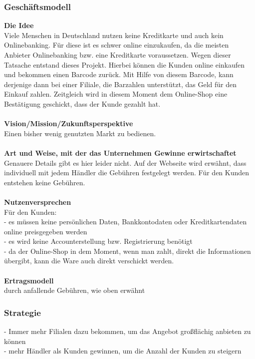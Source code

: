 \subsubsection{Geschäftsmodell}
\textbf{Die Idee}\\
Viele Menschen in Deutschland nutzen keine Kreditkarte und auch kein Onlinebanking. Für diese ist es schwer online 
einzukaufen, da die meisten Anbieter Onlinebanking bzw. eine Kreditkarte voraussetzen. Wegen dieser Tatsache entstand
dieses Projekt. Hierbei können die Kunden online einkaufen und bekommen einen Barcode zurück. Mit Hilfe von diesem
Barcode, kann derjenige dann bei einer Filiale, die Barzahlen unterstützt, das Geld für den Einkauf zahlen. Zeitgleich
wird in diesem Moment dem Online-Shop eine Bestätigung geschickt, dass der Kunde gezahlt hat.\\
\\
\textbf{Vision/Mission/Zukunftsperspektive}\\
Einen bisher wenig genutzten Markt zu bedienen.\\
\\
\textbf{Art und Weise, mit der das Unternehmen Gewinne erwirtschaftet}\\
Genauere Details gibt es hier leider nicht. Auf der Webseite wird erwähnt, dass individuell mit jedem Händler die 
Gebühren festgelegt werden. Für den Kunden entstehen keine Gebühren.\\
\\
\textbf{Nutzenversprechen}\\
Für den Kunden:\\
- es müssen keine persönlichen Daten, Bankkontodaten oder Kreditkartendaten online preisgegeben werden\\
- es wird keine Accounterstellung bzw. Registrierung benötigt\\
- da der Online-Shop in dem Moment, wenn man zahlt, direkt die Informationen übergibt, kann die Ware auch direkt verschickt werden.\\
\\
\textbf{Ertragsmodell}\\
durch anfallende Gebühren, wie oben erwähnt\\
\subsubsection{Strategie}
- Immer mehr Filialen dazu bekommen, um das Angebot großflächig anbieten zu können\\
- mehr Händler als Kunden gewinnen, um die Anzahl der Kunden zu steigern\\
